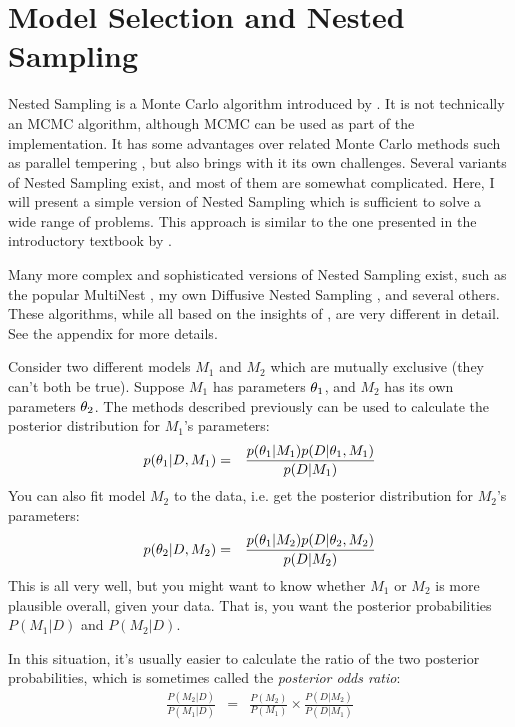 \section{Model Selection and Nested Sampling}\label{sec:model_selection}
Nested Sampling is a Monte Carlo algorithm introduced by \citet{skilling}. It
is not technically an MCMC algorithm, although MCMC can be used as part of the
implementation. It has some advantages over related Monte Carlo methods
such as parallel tempering \citep{pt, gregory, tempering}, but
also brings with it its own challenges.
Several variants of Nested Sampling exist, and most of them are somewhat
complicated. Here, I will present a simple version of Nested Sampling which
is sufficient to solve a wide range of problems. This approach is similar to
the one presented in the introductory textbook by \citet{sivia}.

Many more complex and sophisticated versions of
Nested Sampling exist, such as the popular MultiNest \citep{multinest},
my own Diffusive Nested Sampling \citep{dnest}, and several others. These
algorithms, while all based on the insights of \citet{skilling}, are very
different in detail. See the appendix for more details.

Consider two different models $M_1$ and $M_2$ which are mutually exclusive
(they can't both be true).
Suppose $M_1$ has parameters
$\theta_1$, and $M_2$ has its own parameters $\theta_2$. The methods
described previously can be used to calculate the posterior distribution for
$M_1$'s parameters:
\begin{eqnarray}
p(\theta_1 | D, M_1) &=& \frac{p(\theta_1 | M_1)p(D | \theta_1, M_1)}
{p(D | M_1)}
\end{eqnarray}
You can also fit model $M_2$ to the data, i.e. get the posterior distribution
for $M_2$'s parameters:
\begin{eqnarray}
p(\theta_2 | D, M_2) &=& \frac{p(\theta_1 | M_2)p(D | \theta_2, M_2)}
{p(D | M_2)}
\end{eqnarray}
This is all very well, but you might want to know whether $M_1$ or $M_2$ is
more plausible overall, given your data. That is, you want the posterior
probabilities $P(M_1 | D)$ and $P(M_2 | D)$.

In this situation, it's usually easier to calculate the ratio of the two
posterior probabilities, which is sometimes called the {\it posterior odds
ratio}:
\begin{eqnarray}
\frac{P(M_2 | D)}{P(M_1 | D)} &=& \frac{P(M_2)}{P(M_1)}
\times \frac{P(D | M_2)}{P(D | M_1)}
\end{eqnarray}

